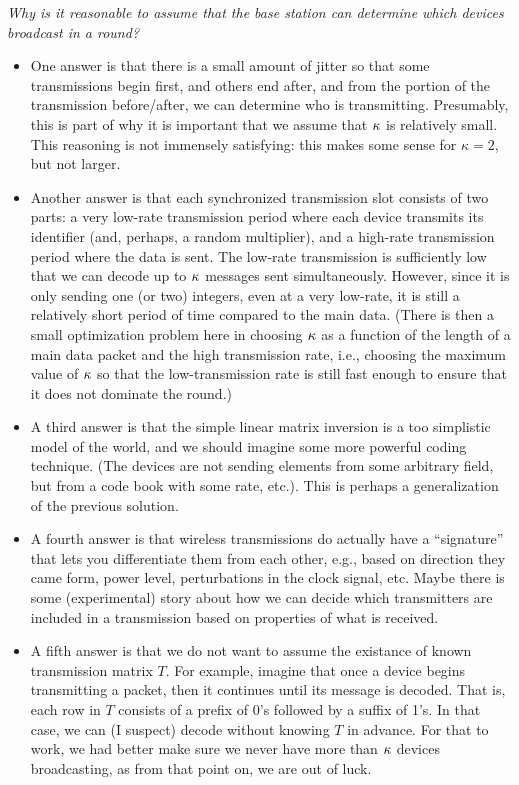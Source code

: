 \emph{Why is it reasonable to assume that the base station can determine which devices broadcast in a round?}  
\begin{itemize} 
\item One answer is that there is a small amount of jitter so that some transmissions begin first, and others end after, and from the portion of the transmission before/after, we can determine who is transmitting.  Presumably, this is part of why it is important that we assume that $\kappa$ is relatively small.  This reasoning is not immensely satisfying: this makes some sense for $\kappa=2$, but not larger.

\item Another answer is that each synchronized transmission slot consists of two parts: a very low-rate transmission period where each device transmits its identifier (and, perhaps, a random multiplier), and a high-rate transmission period where the data is sent.  The low-rate transmission is sufficiently low that we can decode up to $\kappa$ messages sent simultaneously.  However, since it is only sending one (or two) integers, even at a very low-rate, it is still a relatively short period of time compared to the main data.  (There is then a small optimization problem here in choosing $\kappa$ as a function of the length of a main data packet and the high transmission rate, i.e., choosing the maximum value of $\kappa$ so that the low-transmission rate is still fast enough to ensure that it does not dominate the round.)

\item A third answer is that the simple linear matrix inversion is a too simplistic model of the world, and we should imagine some more powerful coding technique.  (The devices are not sending elements from some arbitrary field, but from a code book with some rate, etc.).  This is perhaps a generalization of the previous solution.

\item A fourth answer is that wireless transmissions do actually have a ``signature'' that lets you differentiate them from each other, e.g., based on direction they came form, power level, perturbations in the clock signal, etc.  Maybe there is some (experimental) story about how we can decide which transmitters are included in a transmission based on properties of what is received.  

\item A fifth answer is that we do not want to assume the existance of known transmission matrix $T$.  For example, imagine that once a device begins transmitting a packet, then it continues until its message is decoded.  That is, each row in $T$ consists of a prefix of 0's followed by a suffix of 1's.  In that case, we can (I suspect) decode without knowing $T$ in advance.  For that to work, we had better make sure we never have more than $\kappa$ devices broadcasting, as from that point on, we are out of luck.
\end{itemize}  


